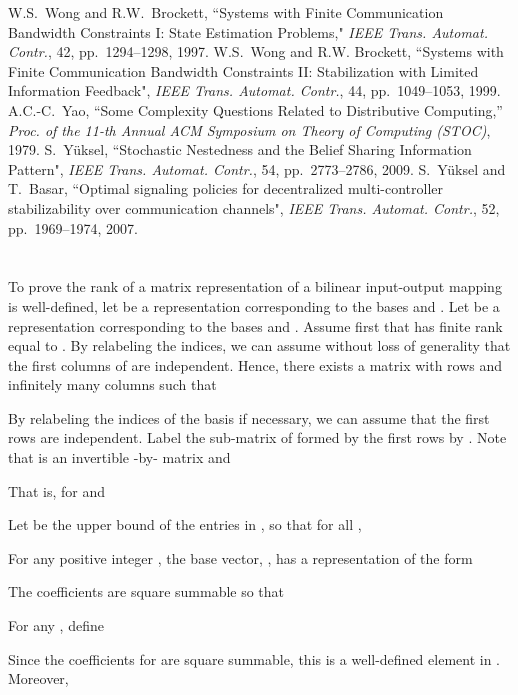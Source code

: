 \documentclass[12pt,onecolumn,draftcls]{IEEEtran}
\begin{document}
\begin{thebibliography}{99}
W.S.\ Wong and R.W.\ Brockett, ``Systems with Finite Communication Bandwidth Constraints {I}: State Estimation Problems," {\em IEEE Trans. Automat. Contr.}, 42, pp.~1294--1298, 1997.
W.S.\ Wong and R.W. Brockett,  ``Systems with Finite Communication Bandwidth Constraints {II}: Stabilization with Limited
Information Feedback", {\em IEEE Trans. Automat. Contr.}, 44, pp.~1049--1053, 1999.
A.C.-C.\ Yao, ``Some Complexity Questions Related to Distributive Computing,'' {\em Proc. of the 11-th Annual ACM Symposium on Theory of Computing (STOC)}, 1979.
S.\ Y\"{u}ksel, ``Stochastic Nestedness and the Belief Sharing Information Pattern", {\em IEEE Trans. Automat. Contr.}, 54, pp.~2773--2786, 2009.
S.\ Y\"{u}ksel and T.\ Basar, ``Optimal signaling policies for decentralized
multi-controller stabilizability over communication channels", {\em IEEE Trans. Automat. Contr.}, 52, pp.~1969--1974, 2007.
\end{thebibliography}
\appendices
\section{}\setcounter{equation}{0}
\setcounter{section}{8}

To prove the rank of a matrix representation of a bilinear input-output mapping is well-defined, let
 be a representation corresponding to the bases 
and .  Let  be a representation corresponding to the bases 
and .  Assume first that  has finite rank equal to .
By relabeling the indices, we can assume without loss of generality that the first  columns of 
are independent.  Hence, there exists a matrix  with  rows and infinitely many columns such that

By relabeling the indices of the basis  if necessary, we can assume that the
first  rows  are independent.  Label the sub-matrix of  formed by
the first  rows by .  Note that  is an invertible -by- matrix and

That is, for  and 

Let  be the upper bound of the entries in , so that for all ,

For any positive integer , the base vector, , has a representation of the form

The coefficients are square summable so that

For any , define

Since the coefficients for  are square summable, this is a well-defined element in .
Moreover,
\end{document}
